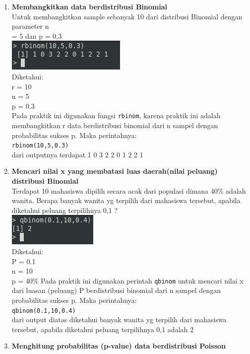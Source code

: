 \documentclass[a4paper,12pt]{article}
\begin{document}
\begin{enumerate}[label=\textbf{\Alph*.}]
\newpage
\item\textbf{Membangkitkan data berdistribusi Binomial\\}
Untuk membangkitkan sample sebanyak 10 dari distribusi Binomial dengan parameter n\\
= 5 dan p = 0,3\\
\includegraphics[scale=1]{prakb1}\\
Diketahui:\\
r =  10\\
n = 5\\
p = 0.3\\
Pada  praktik ini digunakan fungsi \texttt{rbinom}, karena praktik ini adalah membangkitkan r data berdistribusi binomial dari n sampel
dengan probabilitas sukses p. Maka perintahnya:\\
\texttt{rbinom(10,5,0.3)}\\
dari outputnya terdapat 1 0 3 2 2 0 1 2 2 1

\item \textbf{Mencari nilai x yang membatasi luas daerah(nilai peluang) distribusi Binomial\\}
Terdapat 10 mahasiswa dipilih secara acak dari populasi dimana 40\% adalah wanita.
Berapa banyak wanita yg terpilih dari mahasiswa tersebut, apabila diketahui peluang
terpilihnya 0,1 ?\\
\includegraphics[scale=1]{prakc}\\
Diketahui:\\
P = 0.1\\
n = 10 \\
p = 40\%
Pada praktik ini digunakan perintah \texttt{qbinom} untuk mencari nilai x dari luasan (peluang) P berdistribusi binomial
dari n sampel dengan probabilitas sukses p. Maka perintahnya:\\
\texttt{qbinom(0.1,10,0.4)}\\
dari output diatas diketahui banyak wanita yg terpilih dari mahasiswa tersebut, apabila diketahui peluang
terpilihnya 0,1 adalah 2

\newpage
\item \textbf{Menghitung probabilitas (p-value) data berdistribusi Poisson}

\end{enumerate}
\end{document}
